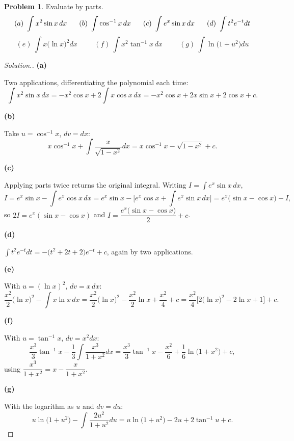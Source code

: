 \documentclass[11pt,a4paper]{article}
\theoremstyle{definition}
\newtheorem{problemx}{Problem}[subsection]
\newenvironment{problem}{\begin{problemx}}{\end{problemx}}
\newenvironment{solution}
  {\renewcommand{\qedsymbol}{}\begin{proof}[\textit{Solution}.]}
  {\end{proof}}
\newcommand{\subhead}[1]{%
  \par\medskip\noindent\textbf{#1}\par\nobreak\smallskip}
\begin{document}
\begin{problem}
Evaluate by parts.
$$(a)\ \int x^2\sin x\,dx\hspace{0.6cm}(b)\ \int\cos^{-1}x\,dx
\hspace{0.6cm}(c)\ \int e^x\sin x\,dx\hspace{0.6cm}(d)\ \int t^2e^{-t}dt$$
$$(e)\ \int x\big(\ln x\big)^2dx\hspace{1cm}(f)\ \int x^2\tan^{-1}x\,dx
\hspace{1cm}(g)\ \int\ln\big(1+u^2\big)du$$
\end{problem}
\begin{solution}
\subhead{(a)} Two applications, differentiating the polynomial each time:
$$\int x^2\sin x\,dx = -x^2\cos x + 2\int x\cos x\,dx
= -x^2\cos x + 2x\sin x + 2\cos x + c .$$

\subhead{(b)} Take $u = \cos^{-1}x$, $dv = dx$:
$$x\cos^{-1}x + \int\frac{x}{\sqrt{1-x^2}}dx = x\cos^{-1}x - \sqrt{1-x^2} + c .$$

\subhead{(c)} Applying parts twice returns the original integral. Writing
$I = \int e^x\sin x\,dx$,
$$I = e^x\sin x - \int e^x\cos x\,dx
= e^x\sin x - \Big[e^x\cos x + \int e^x\sin x\,dx\Big]
= e^x\big(\sin x - \cos x\big) - I ,$$
so $2I = e^x(\sin x - \cos x)$ and
$I = \dfrac{e^x\big(\sin x-\cos x\big)}{2} + c$.

\subhead{(d)}
$\displaystyle\int t^2e^{-t}dt = -\big(t^2+2t+2\big)e^{-t} + c$, again by two
applications.

\subhead{(e)} With $u = (\ln x)^2$, $dv = x\,dx$:
$$\frac{x^2}{2}\big(\ln x\big)^2 - \int x\ln x\,dx
= \frac{x^2}{2}\big(\ln x\big)^2 - \frac{x^2}{2}\ln x + \frac{x^2}{4} + c
= \frac{x^2}{4}\Big[2\big(\ln x\big)^2 - 2\ln x + 1\Big] + c .$$

\subhead{(f)} With $u = \tan^{-1}x$, $dv = x^2dx$:
$$\frac{x^3}{3}\tan^{-1}x - \frac13\int\frac{x^3}{1+x^2}dx
= \frac{x^3}{3}\tan^{-1}x - \frac{x^2}{6} + \frac16\ln\big(1+x^2\big) + c ,$$
using $\dfrac{x^3}{1+x^2} = x - \dfrac{x}{1+x^2}$.

\subhead{(g)} With the logarithm as $u$ and $dv = du$:
$$u\ln\big(1+u^2\big) - \int\frac{2u^2}{1+u^2}du
= u\ln\big(1+u^2\big) - 2u + 2\tan^{-1}u + c .$$
\end{solution}
\end{document}
